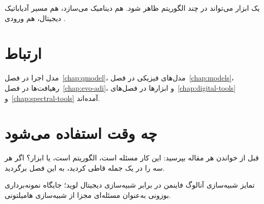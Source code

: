 یک ابزار می‌تواند در چند الگوریتم ظاهر شود.  هم دینامیک می‌سازد، هم مسیر آدیاباتیک دیجیتال، هم ورودی .

\section{ارتباط}

مدل اجرا در فصل~\ref{chap:qmodel}، مدل‌های فیزیکی در فصل~\ref{chap:models}، رهیافت‌ها در فصل~\ref{chap:evo-adi}، و ابزارها در فصل‌های~\ref{chap:digital-tools} و~\ref{chap:spectral-tools} آمده‌اند.

\section{چه وقت استفاده می‌شود}

قبل از خواندن هر مقاله بپرسید: این کار مسئله است، الگوریتم است، یا ابزار؟ اگر هر سه را در یک جمله قاطی کردید، به این فصل برگردید.

\begin{remark}
تمایز شبیه‌سازی آنالوگ فاینمن در برابر شبیه‌سازی دیجیتال لوید؛ جایگاه نمونه‌برداری بوزونی به‌عنوان مسئله‌ای مجزا از شبیه‌سازی هامیلتونی.
\end{remark}
